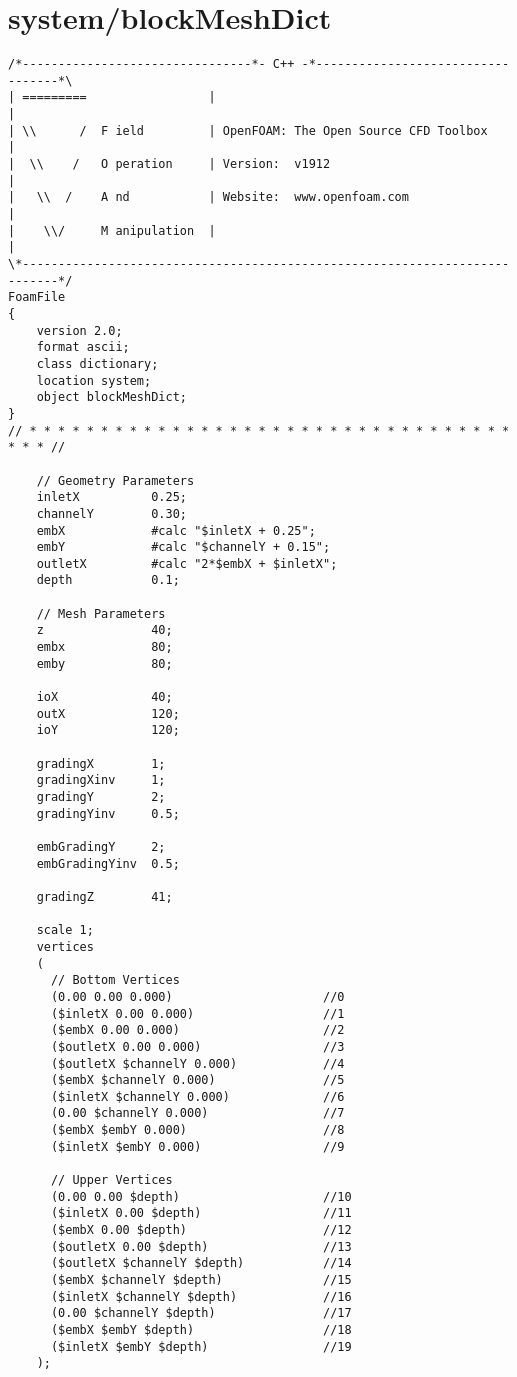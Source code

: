 \section{system/blockMeshDict}
\begin{lstlisting}
/*--------------------------------*- C++ -*----------------------------------*\
| =========                 |                                                 |
| \\      /  F ield         | OpenFOAM: The Open Source CFD Toolbox           |
|  \\    /   O peration     | Version:  v1912                                 |
|   \\  /    A nd           | Website:  www.openfoam.com                      |
|    \\/     M anipulation  |                                                 |
\*---------------------------------------------------------------------------*/
FoamFile
{
    version 2.0;
    format ascii;
    class dictionary;
    location system;
    object blockMeshDict;
}
// * * * * * * * * * * * * * * * * * * * * * * * * * * * * * * * * * * * * * //

    // Geometry Parameters
    inletX			0.25;
    channelY		0.30;
    embX			#calc "$inletX + 0.25";
    embY			#calc "$channelY + 0.15";
    outletX			#calc "2*$embX + $inletX";
    depth			0.1;
    
    // Mesh Parameters
    z				40;
    embx			80;
    emby			80;
    
    ioX				40;
    outX			120;
    ioY				120;

	gradingX		1;
	gradingXinv		1;
	gradingY		2;
	gradingYinv		0.5;
	
	embGradingY		2;
	embGradingYinv	0.5;
	
	gradingZ		41;

    scale 1;
    vertices  
    (
      // Bottom Vertices
      (0.00 0.00 0.000)						//0
      ($inletX 0.00 0.000)					//1
      ($embX 0.00 0.000)					//2
      ($outletX 0.00 0.000)					//3
      ($outletX $channelY 0.000)			//4
      ($embX $channelY 0.000)				//5
      ($inletX $channelY 0.000)				//6
      (0.00 $channelY 0.000)				//7
      ($embX $embY 0.000)					//8
      ($inletX $embY 0.000)					//9
		
      // Upper Vertices	
      (0.00 0.00 $depth)					//10
      ($inletX 0.00 $depth)					//11
      ($embX 0.00 $depth)					//12
      ($outletX 0.00 $depth)				//13
      ($outletX $channelY $depth)			//14
      ($embX $channelY $depth)				//15
      ($inletX $channelY $depth)			//16
      (0.00 $channelY $depth)				//17
      ($embX $embY $depth)					//18
      ($inletX $embY $depth)				//19
    );


\end{lstlisting}
